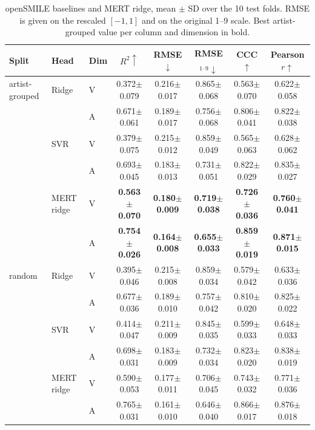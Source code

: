\begin{table}[t]
\centering
\caption{openSMILE baselines and MERT ridge, mean $\pm$ SD over the 10 test folds. RMSE is given on the rescaled $[-1,1]$ and on the original 1--9 scale. Best artist-grouped value per column and dimension in bold.}
\label{tab:baseline}
\footnotesize
\begin{tabular}{@{}lllccccc@{}}
\toprule
Split & Head & Dim & $R^2\uparrow$ & RMSE$\downarrow$ & RMSE$_{1\text{--}9}\downarrow$ & CCC$\uparrow$ & Pearson $r\uparrow$ \\
\midrule
artist-grouped & Ridge & V & 0.372$\pm$0.079 & 0.216$\pm$0.017 & 0.865$\pm$0.068 & 0.563$\pm$0.070 & 0.622$\pm$0.058 \\
 &  & A & 0.671$\pm$0.061 & 0.189$\pm$0.017 & 0.756$\pm$0.068 & 0.806$\pm$0.041 & 0.822$\pm$0.038 \\
 & SVR & V & 0.379$\pm$0.075 & 0.215$\pm$0.012 & 0.859$\pm$0.049 & 0.565$\pm$0.063 & 0.628$\pm$0.062 \\
 &  & A & 0.693$\pm$0.045 & 0.183$\pm$0.013 & 0.731$\pm$0.051 & 0.822$\pm$0.029 & 0.835$\pm$0.027 \\
 & MERT ridge & V & \textbf{0.563$\pm$0.070} & \textbf{0.180$\pm$0.009} & \textbf{0.719$\pm$0.038} & \textbf{0.726$\pm$0.036} & \textbf{0.760$\pm$0.041} \\
 &  & A & \textbf{0.754$\pm$0.026} & \textbf{0.164$\pm$0.008} & \textbf{0.655$\pm$0.033} & \textbf{0.859$\pm$0.019} & \textbf{0.871$\pm$0.015} \\
\midrule
random & Ridge & V & 0.395$\pm$0.046 & 0.215$\pm$0.008 & 0.859$\pm$0.034 & 0.579$\pm$0.042 & 0.633$\pm$0.036 \\
 &  & A & 0.677$\pm$0.036 & 0.189$\pm$0.010 & 0.757$\pm$0.042 & 0.810$\pm$0.020 & 0.825$\pm$0.022 \\
 & SVR & V & 0.414$\pm$0.047 & 0.211$\pm$0.009 & 0.845$\pm$0.035 & 0.599$\pm$0.033 & 0.648$\pm$0.033 \\
 &  & A & 0.698$\pm$0.031 & 0.183$\pm$0.009 & 0.732$\pm$0.034 & 0.823$\pm$0.020 & 0.838$\pm$0.019 \\
 & MERT ridge & V & 0.590$\pm$0.053 & 0.177$\pm$0.011 & 0.706$\pm$0.045 & 0.743$\pm$0.032 & 0.771$\pm$0.036 \\
 &  & A & 0.765$\pm$0.031 & 0.161$\pm$0.010 & 0.646$\pm$0.040 & 0.866$\pm$0.017 & 0.876$\pm$0.018 \\
\bottomrule
\end{tabular}
\end{table}
